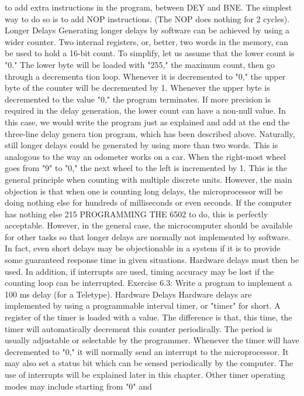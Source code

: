 \documentclass{book}
\begin{document}
to add extra instructions in the program, between DEY and BNE.
The simplest way to do so is to add NOP instructions. (The
NOP does nothing for 2 cycles).
Longer Delays
Generating longer delays by software can be achieved by using
a wider counter. Two internal registers, or, better, two words in the
memory, can be used to hold a 16-bit count. To simplify, let us
assume that the lower count is "0." The lower byte will be loaded
with "255," the maximum count, then go through a decrementa
tion loop. Whenever it is decremented to "0," the upper byte of the
counter will be decremented by 1. Whenever the upper byte is
decremented to the value "0," the program terminates. If more
precision is required in the delay generation, the lower count can
have a non-null value. In this case, we would write the program
just as explained and add at the end the three-line delay genera
tion program, which has been described above.
Naturally, still longer delays could be generated by using more
than two words. This is analogous to the way an odometer works
on a car. When the right-most wheel goes from "9" to "0," the next
wheel to the left is incremented by 1. This is the general principle
when counting with multiple discrete units.
However, the main objection is that when one is counting long
delays, the microprocessor will be doing nothing else for hundreds
of milliseconds or even seconds. If the computer has nothing else
215
PROGRAMMING THE 6502
to do, this is perfectly acceptable. However, in the general case,
the microcomputer should be available for other tasks so that
longer delays are normally not implemented by software. In fact,
even short delays may be objectionable in a system if it is to
provide some guaranteed response time in given situations.
Hardware delays must then be used. In addition, if interrupts are
used, timing accuracy may be lost if the counting loop can be
interrupted.
Exercise 6.3: Write a program to implement a 100 ms delay (for a
Teletype).
Hardware Delays
Hardware delays are implemented by using a programmable
interval timer, or "timer" for short. A register of the timer is loaded
with a value. The difference is that, this time, the timer will
automatically decrement this counter periodically. The period is
usually adjustable or selectable by the programmer. Whenever
the timer will have decremented to "0," it will normally send an
interrupt to the microprocessor. It may also set a status bit which
can be sensed periodically by the computer. The use of interrupts
will be explained later in this chapter.
Other timer operating modes may include starting from "0" and
\end{document}
